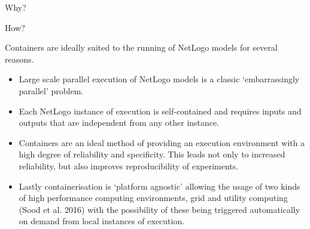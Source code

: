 \documentclass[usenames,dvipsnames,10pt]{beamer}
\begin{document}
\begin{frame}{Why?}
{    }
\end{frame}

\begin{frame}{How?}

    Containers are ideally suited to the running of NetLogo models for several reasons.
    \begin{itemize}
        \item Large scale parallel execution of NetLogo models is a classic
            ‘embarrassingly parallel’ problem.
        \item Each NetLogo instance of execution is self-contained and requires
            inputs and outputs that are independent from any other instance.
        \item Containers are an ideal method of providing an execution
            environment with a high degree of reliability and specificity. This
            leads not only to increased reliability, but also improves
            reproducibility of experiments.
        \item Lastly containerisation is ‘platform agnostic’ allowing the usage
            of two kinds of high performance computing environments, grid and
            utility computing (Sood et al. 2016) with the possibility of these
            being triggered automatically on demand from local instances of
            execution.
    \end{itemize}

\end{frame}
\end{document}
